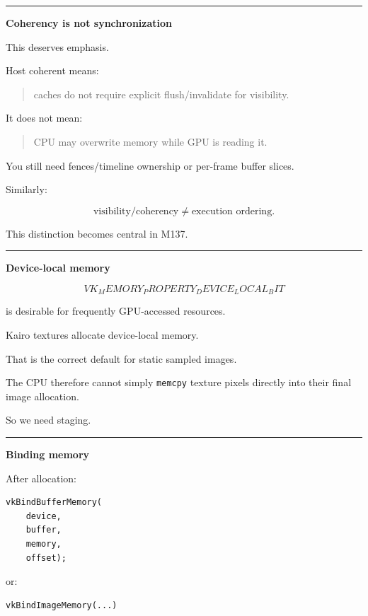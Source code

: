 \begin{center}\rule{0.5\linewidth}{0.5pt}\end{center}

\textbf{Coherency is not synchronization}

This deserves emphasis.

Host coherent means:

\begin{quote}
caches do not require explicit flush/invalidate for visibility.
\end{quote}

It does not mean:

\begin{quote}
CPU may overwrite memory while GPU is reading it.
\end{quote}

You still need fences/timeline ownership or per-frame buffer slices.

Similarly:

\[
\boxed{
\text{visibility/coherency}
\neq
\text{execution ordering}.
}
\]

This distinction becomes central in M137.

\begin{center}\rule{0.5\linewidth}{0.5pt}\end{center}

\textbf{Device-local memory}

\[
VK_MEMORY_PROPERTY_DEVICE_LOCAL_BIT
\]

is desirable for frequently GPU-accessed resources.

Kairo textures allocate device-local memory.

That is the correct default for static sampled images.

The CPU therefore cannot simply \texttt{memcpy} texture pixels directly into their final image allocation.

So we need staging.

\begin{center}\rule{0.5\linewidth}{0.5pt}\end{center}

\textbf{Binding memory}

After allocation:

\begin{verbatim}
vkBindBufferMemory(
    device,
    buffer,
    memory,
    offset);
\end{verbatim}

or:

\begin{verbatim}
vkBindImageMemory(...)
\end{verbatim}

